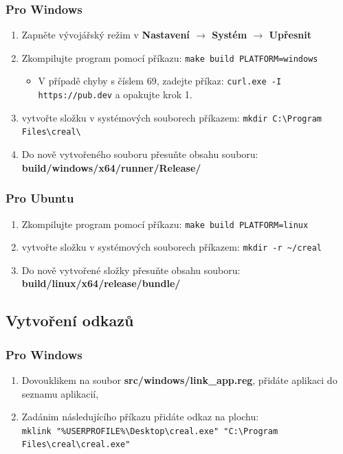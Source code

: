 \documentclass[12pt]{article}
\begin{document}
    \subsubsection{Pro Windows}
    \begin{enumerate}
        \item Zapněte vývojářský režim v \textbf{Nastavení $\rightarrow$ Systém $\rightarrow$ Upřesnit}
        \item Zkompilujte program pomocí příkazu: \verb|make build PLATFORM=windows|
        \begin{itemize}
            \item V případě chyby s číslem 69, zadejte příkaz: \verb|curl.exe -I https://pub.dev| a opakujte krok 1.
        \end{itemize}
        \item vytvořte složku v systémových souborech příkazem: \verb|mkdir C:\Program Files\creal\|
        \item Do nově vytvořeného souboru přesuňte obsahu souboru:\\ \textbf{build/windows/x64/runner/Release/}
    \end{enumerate}
    
    \subsubsection{Pro Ubuntu}
    \begin{enumerate}
        \item Zkompilujte program pomocí příkazu: \verb|make build PLATFORM=linux|
        \item vytvořte složku v systémových souborech příkazem: \verb|mkdir -r ~/creal|
        \item Do nově vytvořené složky přesuňte obsahu souboru:\\ \textbf{build/linux/x64/release/bundle/}
    \end{enumerate}
\newpage
\subsection{Vytvoření odkazů}

\subsubsection{Pro Windows}

\begin{enumerate}
    \item Dovouklikem na soubor \textbf{src/windows/link\_app.reg}, přidáte aplikaci do seznamu aplikacií,
    \item Zadánim následujícího příkazu přidáte odkaz na plochu:\\
    \verb|mklink "%USERPROFILE%\Desktop\creal.exe" "C:\Program Files\creal\creal.exe"|
    
\end{enumerate}
\end{document}

